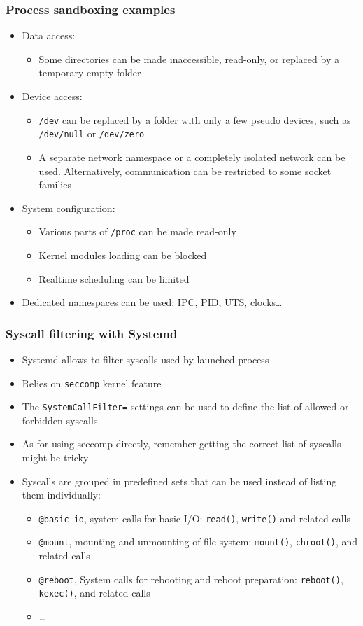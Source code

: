 \begin{frame}
	\frametitle{Process sandboxing examples}
	\begin{itemize}
		\item Data access:
			\begin{itemize}
				\item Some directories can be made inaccessible, read-only, or replaced
					by a temporary empty folder
			\end{itemize}
		\item Device access:
			\begin{itemize}
				\item \texttt{/dev} can be replaced by a folder with only a few pseudo
					devices, such as \texttt{/dev/null} or \texttt{/dev/zero}
				\item A separate network namespace or a completely isolated network can
					be used. Alternatively, communication can be restricted to some socket
					families
			\end{itemize}
		\item System configuration:
			\begin{itemize}
				\item Various parts of \texttt{/proc} can be made read-only
				\item Kernel modules loading can be blocked
				\item Realtime scheduling can be limited
			\end{itemize}
		\item Dedicated namespaces can be used: IPC, PID, UTS, clocks\ldots
	\end{itemize}
\end{frame}

\begin{frame}
	\frametitle{Syscall filtering with Systemd}
	\begin{itemize}
		\item Systemd allows to filter syscalls used by launched process
		\item Relies on \texttt{seccomp} kernel feature
		\item The \texttt{SystemCallFilter=} settings can be used to define the list
			of allowed or forbidden syscalls
		\item As for using seccomp directly, remember getting the correct list of
			syscalls might be tricky
		\item Syscalls are grouped in predefined sets that can be used instead of
			listing them individually:
			\begin{itemize}
				\item \texttt{@basic-io}, system calls for basic I/O: \texttt{read()},
					\texttt{write()} and related calls
				\item \texttt{@mount}, mounting and unmounting of file system:
					\texttt{mount()}, \texttt{chroot()}, and related calls
				\item \texttt{@reboot}, System calls for rebooting and reboot
					preparation: \texttt{reboot()}, \texttt{kexec()}, and related calls
				\item \ldots
			\end{itemize}
	\end{itemize}
\end{frame}

